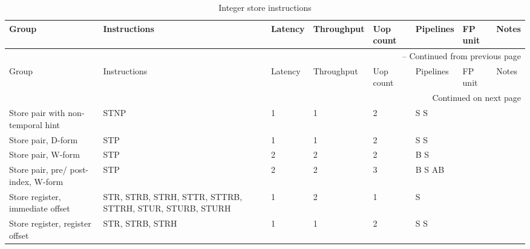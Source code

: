 \begin{longtable}{|p{1in}|p{1in}|l|l|l|p{1in}|l|p{1in}|}
\caption{Integer store instructions} \\
\hline
Group & Instructions & Latency & Throughput & Uop count & Pipelines & FP unit & Notes\\
\hline
\endfirsthead
\hline
\multicolumn{8}{|r|}{{\tablename\ \thetable{} -- Continued from previous page}} \\
\hline
Group & Instructions & Latency & Throughput & Uop count & Pipelines & FP unit & Notes\\
\hline
\endhead
\hline
\multicolumn{8}{|r|}{{Continued on next page}} \\
\hline
\endfoot
\hline
\endlastfoot
Store pair with non-temporal hint & STNP & 1 & 1 & 2 & S S &  & \\
\hline
Store pair, D-form & STP & 1 & 1 & 2 & S S &  & \\
\hline
Store pair, W-form & STP & 2 & 2 & 2 & B S &  & \\
\hline
Store pair, pre/ post-index, W-form & STP & 2 & 2 & 3 & B S AB &  & \\
\hline
Store register, immediate offset & STR, STRB, STRH, STTR, STTRB, STTRH, STUR, STURB, STURH & 1 & 2 & 1 & S &  & \\
\hline
Store register, register offset & STR, STRB, STRH & 1 & 1 & 2 & S S &  & \\
\hline
\end{longtable}
